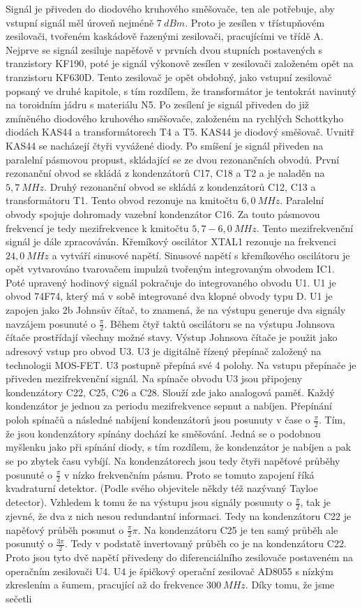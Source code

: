 Signál je přiveden do diodového kruhového směšovače, ten ale potřebuje, aby vstupní signál měl úroveň nejméně $7~dBm$. Proto je zesílen v třístupňovém zesilovači, tvořeném kaskádově řazenými zesilovači, pracujícími ve třídě A. Nejprve se signál zesiluje napěťově v prvních dvou stupních postavených s tranzistory KF190, poté je signál výkonově zesílen v zesilovači založeném opět na tranzistoru KF630D. Tento zesilovač je opět obdobný, jako vstupní zesilovač popsaný ve druhé kapitole, s tím rozdílem, že transformátor je tentokrát navinutý na toroidním jádru s materiálu N5. Po zesílení je signál přiveden do již zmíněného diodového kruhového směšovače, založeném na rychlých Schottkyho diodách KAS44 a transformátorech T4 a T5. KAS44 je diodový směšovač. Uvnitř KAS44 se nacházejí čtyři vyvážené diody. Po smíšení je signál přiveden na paralelní pásmovou propust, skládající se ze dvou rezonančních obvodů. První rezonanční obvod se skládá z kondenzátorů C17, C18 a T2 a je naladěn na $5,7~MHz$. Druhý rezonanční obvod se skládá z kondenzátorů C12, C13 a transformátoru T1. Tento obvod rezonuje na kmitočtu $6,0~MHz$. Paralelní obvody spojuje dohromady vazební kondenzátor C16. Za touto pásmovou frekvencí je tedy mezifrekvence k kmitočtu $5,7-6,0~MHz$. Tento mezifrekvenční signál je dále zpracováván. Křemíkový oscilátor XTAL1 rezonuje na frekvenci $24,0~MHz$ a vytváří sinusové napětí. Sinusové napětí s křemíkového oscilátoru je opět vytvarováno tvarovačem impulzů tvořeným integrovaným obvodem IC1. Poté upravený hodinový signál pokračuje do integrovaného obvodu U1. U1 je obvod 74F74, který má v sobě integrované dva klopné obvody typu D. U1 je zapojen jako 2b Johnsův čítač, to znamená, že na výstupu generuje dva signály navzájem posunuté o $\frac{\pi}{2}$. Během čtyř taktů oscilátoru se na výstupu Johnsova čítače prostřídají všechny možné stavy. Výstup Johnsova čítače je použit jako adresový vstup pro obvod U3. U3 je digitálně řízený přepínač založený na technologii MOS-FET. U3 postupně přepíná své 4 polohy. Na vstupu přepínače je přiveden mezifrekvenční signál. Na spínače obvodu U3 jsou připojeny kondenzátory C22, C25, C26 a C28. Slouží zde jako analogová paměť. Každý kondenzátor je jednou za periodu  mezifrekvence sepnut a nabíjen. Přepínání poloh spínačů a následné nabíjení kondenzátorů jsou posunuty v čase o $\frac{\pi}{2}$. Tím, že jsou kondenzátory spínány dochází ke směšování. Jedná se o podobnou myšlenku jako při spínání diody, s tím rozdílem, že kondenzátor  je nabíjen a pak se po zbytek času vybíjí. Na kondenzátorech jsou tedy čtyři napěťové průběhy posunuté o $\frac{\pi}{2}$ v nízko frekvenčním pásmu. Proto se tomuto zapojení říká kvadraturní detektor. (Podle svého objevitele někdy též nazývaný Tayloe detector). Vzhledem k tomu že na výstupu jsou signály posunuty o $\frac{\pi}{2}$, tak je zjevné, že dva z nich nesou redundantní informaci. Tedy na kondenzátoru C22 je napěťový průběh posunut o $\frac{\pi}{2}\pi$. Na kondenzátoru C25 je ten samý průběh ale posunutý o $\frac{3\pi}{2}$. Tedy v podstatě invertovaný průběh co je na kondenzátoru C22. Proto jsou tyto dvě napětí přivedeny do diferenciálního zesilovače postaveném na operačním zesilovači U4. U4 je špičkový operační zesilovač AD8055 s nízkým zkreslením a šumem, pracující až do frekvence $300~MHz$. Díky tomu, že jsme sečetli 
